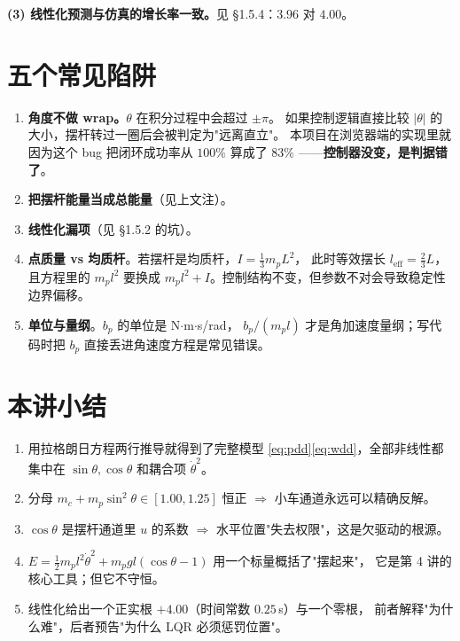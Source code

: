 \textbf{(3) 线性化预测与仿真的增长率一致。}见 \S1.5.4：$3.96$ 对 $4.00$。


\section{五个常见陷阱}

\begin{enumerate}[leftmargin=2em,itemsep=4pt]
  \item \textbf{角度不做 wrap。}$\theta$ 在积分过程中会超过 $\pm\pi$。
        如果控制逻辑直接比较 $|\theta|$ 的大小，摆杆转过一圈后会被判定为"远离直立"。
        本项目在浏览器端的实现里就因为这个 bug 把闭环成功率从 $100\%$ 算成了 $83\%$
        ——\textbf{控制器没变，是判据错了}。
  \item \textbf{把摆杆能量当成总能量}（见上文注）。
  \item \textbf{线性化漏项}（见 \S1.5.2 的坑）。
  \item \textbf{点质量 vs 均质杆}。若摆杆是均质杆，$I=\tfrac13 m_p L^2$，
        此时等效摆长 $l_{\mathrm{eff}}=\tfrac23 L$，且方程里的 $m_p l^2$ 要换成
        $m_p l^2 + I$。控制结构不变，但参数不对会导致稳定性边界偏移。
  \item \textbf{单位与量纲}。$b_p$ 的单位是 N$\cdot$m$\cdot$s/rad，
        $b_p/(m_p l)$ 才是角加速度量纲；写代码时把 $b_p$ 直接丢进角速度方程是常见错误。
\end{enumerate}

\section{本讲小结}

\begin{enumerate}[leftmargin=2em,itemsep=2pt]
  \item 用拉格朗日方程两行推导就得到了完整模型
        \eqref{eq:pdd}\eqref{eq:wdd}，全部非线性都集中在 $\sin\theta,\cos\theta$ 和耦合项 $\dot\theta^2$。
  \item 分母 $m_c+m_p\sin^2\theta\in[1.00,1.25]$ 恒正 $\Rightarrow$ 小车通道永远可以精确反解。
  \item $\cos\theta$ 是摆杆通道里 $u$ 的系数 $\Rightarrow$ 水平位置"失去权限"，这是欠驱动的根源。
  \item $E=\tfrac12 m_pl^2\dot\theta^2+m_pgl(\cos\theta-1)$ 用一个标量概括了"摆起来"，
        它是第 4 讲的核心工具；但它不守恒。
  \item 线性化给出一个正实根 $+4.00$（时间常数 $0.25$\,s）与一个零根，
        前者解释"为什么难"，后者预告"为什么 LQR 必须惩罚位置"。
\end{enumerate}

